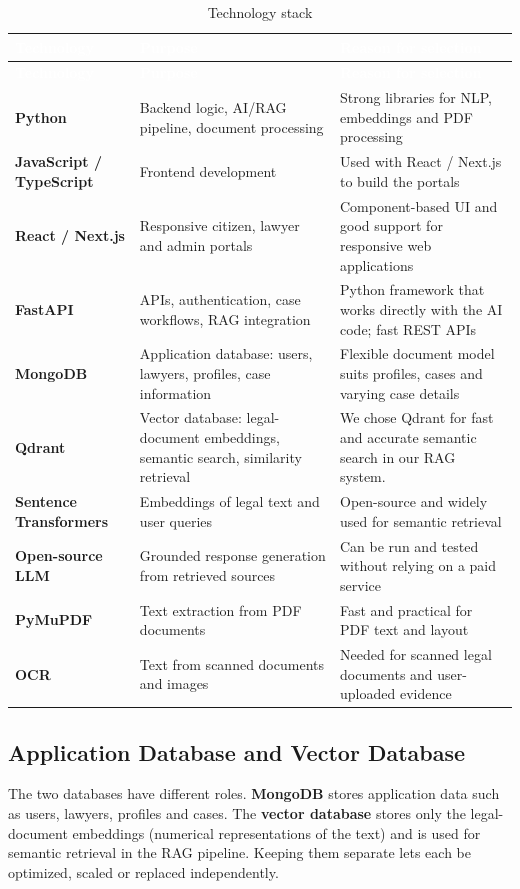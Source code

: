 \documentclass[12pt,a4paper]{report}
\newcommand{\thd}[1]{\textcolor{white}{\textbf{#1}}}
\newcommand{\headrow}{\rowcolor{tablehead}}
\begin{document}
\begin{longtable}{|L{3.6cm}|L{5.0cm}|L{5.4cm}|}
\caption{Technology stack}\label{tab:tech}\\
\hline
\headrow \thd{Technology} & \thd{Purpose} & \thd{Reason for selection} \\ \hline
\endfirsthead
\hline
\headrow \thd{Technology} & \thd{Purpose} & \thd{Reason for selection} \\ \hline
\endhead
\textbf{Python} & Backend logic, AI/RAG pipeline, document processing & Strong libraries for NLP, embeddings and PDF processing \\ \hline
{}\textbf{JavaScript / TypeScript} & Frontend development & Used with React / Next.js to build the portals \\ \hline
\textbf{React / Next.js} & Responsive citizen, lawyer and admin portals & Component-based UI and good support for responsive web applications \\ \hline
{}\textbf{FastAPI} & APIs, authentication, case workflows, RAG integration & Python framework that works directly with the AI code; fast REST APIs \\ \hline
\textbf{MongoDB} & Application database: users, lawyers, profiles, case information & Flexible document model suits profiles, cases and varying case details \\ \hline
{}\textbf{Qdrant} & Vector database: legal-document embeddings, semantic search, similarity retrieval & We chose Qdrant for fast and accurate semantic search in our RAG system. \\ \hline
\textbf{Sentence Transformers} & Embeddings of legal text and user queries & Open-source and widely used for semantic retrieval \\ \hline
{}\textbf{Open-source LLM} & Grounded response generation from retrieved sources & Can be run and tested without relying on a paid service \\ \hline
\textbf{PyMuPDF} & Text extraction from PDF documents & Fast and practical for PDF text and layout \\ \hline
{}\textbf{OCR} & Text from scanned documents and images & Needed for scanned legal documents and user-uploaded evidence \\ \hline
\end{longtable}

\subsection*{Application Database and Vector Database}
The two databases have different roles. \textbf{MongoDB} stores application data such as users, lawyers, profiles and cases. The \textbf{vector database} stores only the legal-document embeddings (numerical representations of the text) and is used for semantic retrieval in the RAG pipeline. Keeping them separate lets each be optimized, scaled or replaced independently.
\end{document}
